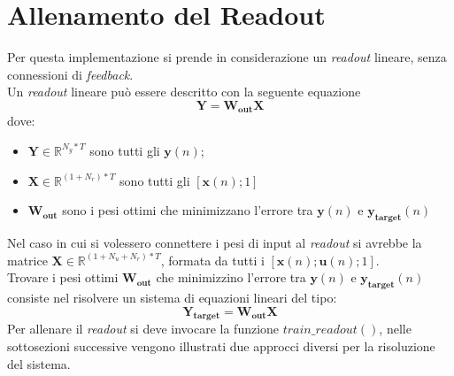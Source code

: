 \section{Allenamento del Readout}
Per questa implementazione si prende in considerazione un \textit{readout} lineare, senza connessioni di \textit{feedback}.\\
Un \textit{readout} lineare può essere descritto con la seguente equazione
\begin{equation} \label{eq:readout}
\mathbf{Y}= \mathbf{W_{out}X}
\end{equation}
dove:
\begin{itemize}
	\item $\mathbf{Y} \in \mathbb{R}^{N_y*T}$ sono tutti gli $\mathbf{y}(n)$;
	\item $\mathbf{X} \in \mathbb{R}^{(1+N_r)*T}$ sono tutti gli $[\mathbf{x}(n);1]$
	\item $\mathbf{W_{out}}$ sono i pesi ottimi che minimizzano l'errore tra $\mathbf{y}(n)$ e $\mathbf{y_{target}}(n)$
\end{itemize}
Nel caso in cui si volessero connettere i pesi di input al \textit{readout} si avrebbe la matrice $\mathbf{X} \in \mathbb{R}^{(1+N_u+N_r)*T}$, formata da tutti i $[\mathbf{x}(n);\mathbf{u}(n);1]$.\\
Trovare i pesi ottimi $\mathbf{W_{out}}$ che minimizzino l'errore tra $\mathbf{y}(n)$ e $\mathbf{y_{target}}(n)$ consiste nel risolvere un sistema di equazioni lineari del tipo:
\begin{equation} \label{eq:readout_targ}
\mathbf{Y_{target}}= \mathbf{W_{out}X}
\end{equation}
Per allenare il \textit{readout} si deve invocare la funzione $\mathit{train\_readout()}$, nelle sottosezioni successive vengono illustrati due approcci diversi per la risoluzione del sistema.


